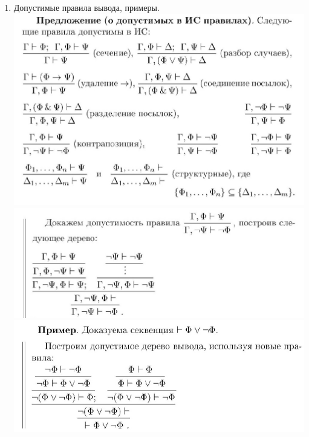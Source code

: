 \documentclass[a4paper]{article}
\theoremstyle{definition}
\begin{document}
\begin{enumerate}
\begin{proof}
        Рассмотрим случай, когда последнее правило в $D$ имеет вид $\frac{\Gamma \vdash \Phi; \Gamma \vdash (\Phi \rightarrow \Psi)}{\Gamma \vdash \Psi}$. Рассмотрим произвольное означивание и покажем, что секвенция $\Gamma \vdash \Psi$ истинна при этом означивании. Если одна из формул в $\Gamma$ ложна, секвенция истинна. Предположим, все формулы в $\Gamma$ истинны. Тогда истинны формулы $\Phi$ и $(\Phi \rightarrow \Psi)$. Ясно, что $\Psi$ тоже истинна.\\
        Остальные правила разбираются аналогично.
       \end{proof}
 \item Допустимые правила вывода, примеры.
       \mbox{}\\ \includegraphics[scale=0.35]{34_1.jpg}\\
       \includegraphics[scale=0.35]{34_2.jpg}\\
       \includegraphics[scale=0.35]{34_3.jpg}

\end{enumerate}
\end{document}
